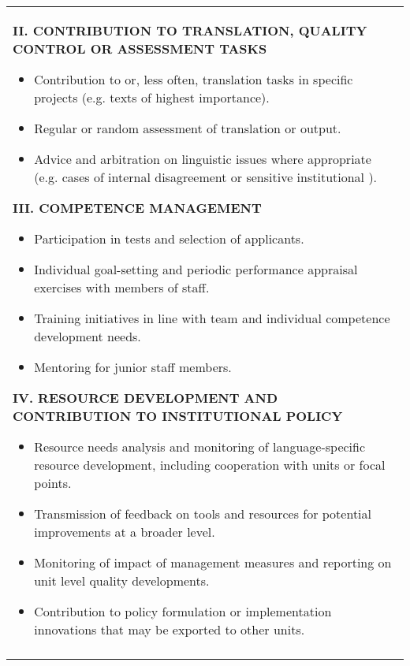\documentclass[output=paper]{langsci/langscibook}
\begin{document}
\begin{table}[t]
\footnotesize
\begin{tabularx}{\textwidth}{Q}
\midrule

 \parbox{.9\textwidth}{
\textbf{II. CONTRIBUTION TO TRANSLATION, QUALITY CONTROL OR ASSESSMENT TASKS} 


\begin{itemize}
\item 
Contribution to  or, less often, translation tasks in specific projects (e.g. texts of highest importance).
\item 
Regular or random assessment of translation or  output.
\item 
Advice and arbitration on linguistic issues where appropriate (e.g. cases of internal disagreement or sensitive institutional ).
\end{itemize}

\textbf{III. COMPETENCE MANAGEMENT}


\begin{itemize}
\item 
Participation in  tests and selection of applicants. 
\item 
Individual goal-setting and periodic performance appraisal exercises with members of staff.
\item 
Training initiatives in line with team and individual competence development needs.
\item 
Mentoring  for junior staff members.
\end{itemize}

\textbf{IV. RESOURCE DEVELOPMENT AND CONTRIBUTION TO INSTITUTIONAL  POLICY}


\begin{itemize}
\item 
Resource needs analysis and monitoring of language-specific resource development, including cooperation with  units or focal points.
\item 
Transmission of feedback on tools and resources for potential improvements at a broader level. 
\item 
Monitoring of impact of management measures and reporting on unit level quality developments.
\item 
Contribution to  policy formulation or implementation innovations that may be exported to other units.
\end{itemize} 
}\\
\lspbottomrule
\end{tabularx}
\end{table}
\end{document}
